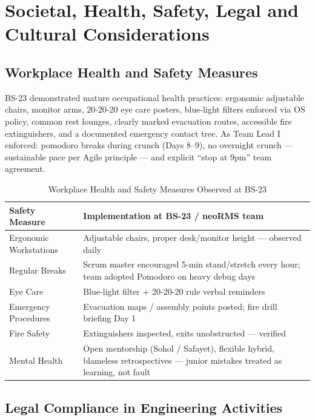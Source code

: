 \chapter{Societal, Health, Safety, Legal and Cultural Considerations}
\label{ch:societal}

\section{Workplace Health and Safety Measures}

BS-23 demonstrated mature occupational health practices: ergonomic adjustable chairs, monitor arms, 20-20-20 eye care posters, blue-light filters enforced via OS policy, common rest lounges, clearly marked evacuation routes, accessible fire extinguishers, and a documented emergency contact tree. As Team Lead I enforced: pomodoro breaks during crunch (Days 8--9), no overnight crunch --- sustainable pace per Agile principle --- and explicit ``stop at 9pm'' team agreement.

\begin{table}[H]
\centering
\caption{Workplace Health and Safety Measures Observed at BS-23}
\label{tab:safety}
\begin{tabularx}{\textwidth}{@{}p{}X@{}}
\toprule
\textbf{Safety Measure} & \textbf{Implementation at BS-23 / neoRMS team} \\
\midrule
Ergonomic Workstations & Adjustable chairs, proper desk/monitor height --- observed daily \\
Regular Breaks & Scrum master encouraged 5-min stand/stretch every hour; team adopted Pomodoro on heavy debug days \\
Eye Care & Blue-light filter + 20-20-20 rule verbal reminders \\
Emergency Procedures & Evacuation maps / assembly points posted; fire drill briefing Day 1 \\
Fire Safety & Extinguishers inspected, exits unobstructed --- verified \\
Mental Health & Open mentorship (Sohol / Safayet), flexible hybrid, blameless retrospectives --- junior mistakes treated as learning, not fault \\
\bottomrule
\end{tabularx}
\end{table}

\section{Legal Compliance in Engineering Activities}

